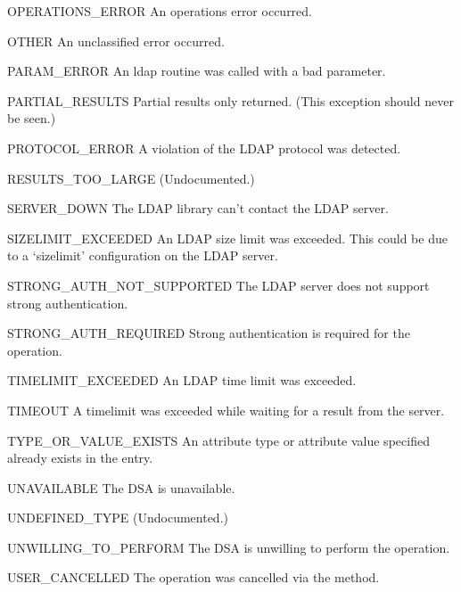 \begin{excdesc}{OPERATIONS_ERROR}
	An operations error occurred.
\end{excdesc}
\begin{excdesc}{OTHER}
	An unclassified error occurred.
\end{excdesc}
\begin{excdesc}{PARAM_ERROR}
	An ldap routine was called with a  bad parameter.
\end{excdesc}
\begin{excdesc}{PARTIAL_RESULTS}
	Partial results only returned. 
	(This exception should never be seen.)
\end{excdesc}
\begin{excdesc}{PROTOCOL_ERROR}
	A violation of the LDAP protocol was detected.
\end{excdesc}
\begin{excdesc}{RESULTS_TOO_LARGE}
	(Undocumented.)
\end{excdesc}
\begin{excdesc}{SERVER_DOWN}
	The  LDAP  library  can't  contact the LDAP server.
\end{excdesc}
\begin{excdesc}{SIZELIMIT_EXCEEDED}
	An LDAP size limit was exceeded.
	This could be due to a `sizelimit' configuration on the LDAP server.
\end{excdesc}
\begin{excdesc}{STRONG_AUTH_NOT_SUPPORTED}
	The   LDAP  server  does  not  support strong authentication.
\end{excdesc}
\begin{excdesc}{STRONG_AUTH_REQUIRED}
	Strong authentication is required  for the operation.
\end{excdesc}
\begin{excdesc}{TIMELIMIT_EXCEEDED}
	An LDAP time limit was exceeded.
\end{excdesc}
\begin{excdesc}{TIMEOUT}
	A timelimit was exceeded while waiting for a result from the server.
\end{excdesc}
\begin{excdesc}{TYPE_OR_VALUE_EXISTS}
	An  attribute  type or attribute value specified already 
	exists in the entry.
\end{excdesc}
\begin{excdesc}{UNAVAILABLE}
	The DSA is unavailable.
\end{excdesc}
\begin{excdesc}{UNDEFINED_TYPE}
	(Undocumented.)
\end{excdesc}
\begin{excdesc}{UNWILLING_TO_PERFORM}
	The  DSA  is  unwilling to perform the operation.
\end{excdesc}
\begin{excdesc}{USER_CANCELLED}
	The operation was cancelled via the  method.
\end{excdesc}

